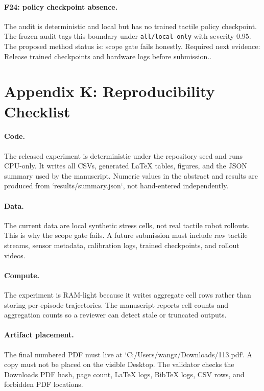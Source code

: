 \documentclass{article}
\begin{document}
\paragraph{F24: policy checkpoint absence.} The audit is deterministic and local but has no trained tactile policy checkpoint. The frozen audit tags this boundary under \texttt{all/local-only} with severity 0.95. The proposed method status is: scope gate fails honestly. Required next evidence: Release trained checkpoints and hardware logs before submission..

\clearpage
\section{Appendix K: Reproducibility Checklist}
\paragraph{Code.}
The released experiment is deterministic under the repository seed and runs CPU-only. It writes all CSVs, generated LaTeX tables, figures, and the JSON summary used by the manuscript. Numeric values in the abstract and results are produced from `results/summary.json`, not hand-entered independently.

\paragraph{Data.}
The current data are local synthetic stress cells, not real tactile robot rollouts. This is why the scope gate fails. A future submission must include raw tactile streams, sensor metadata, calibration logs, trained checkpoints, and rollout videos.

\paragraph{Compute.}
The experiment is RAM-light because it writes aggregate cell rows rather than storing per-episode trajectories. The manuscript reports cell counts and aggregation counts so a reviewer can detect stale or truncated outputs.

\paragraph{Artifact placement.}
The final numbered PDF must live at `C:/Users/wangz/Downloads/113.pdf`. A copy must not be placed on the visible Desktop. The validator checks the Downloads PDF hash, page count, LaTeX logs, BibTeX logs, CSV rows, and forbidden PDF locations.
\end{document}
